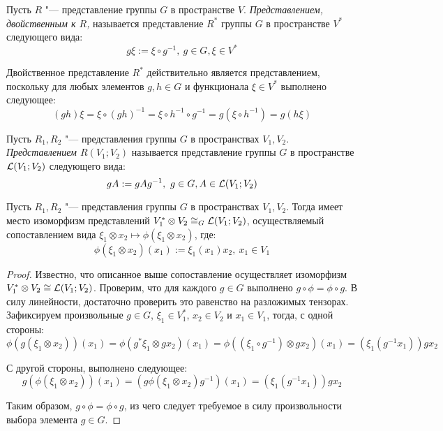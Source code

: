 \begin{definition}
	Пусть $R$ "--- представление группы $G$ в пространстве $V$. \textit{Представлением, двойственным к $R$,} называется представление $R^*$ группы $G$ в пространстве $V^*$ следующего вида:
	\[g\xi := \xi\circ g^{-1},~g \in G, \xi \in V^*\]
\end{definition}

\begin{note}
	Двойственное представление $R^*$ действительно является представлением, поскольку для любых элементов $g, h \in G$ и функционала $\xi \in V^*$ выполнено следующее:
	\[(gh)\xi = \xi \circ (gh)^{-1} = \xi \circ h^{-1} \circ g^{-1} = g(\xi \circ h^{-1})= g(h\xi)\]
\end{note}

\begin{definition}
	Пусть $R_1, R_2$ "--- представления группы $G$ в пространствах $V_1, V_2$. \textit{Представлением $R(V_1; V_2)$} называется представление группы $G$ в пространстве $\mathcal L(V_1; V_2)$ следующего вида:
	\[gA := gAg^{-1},~g \in G, A \in \mathcal L(V_1; V_2)\]
\end{definition}

\begin{proposition}
	Пусть $R_1, R_2$ "--- представления группы $G$ в пространствах $V_1, V_2$. Тогда имеет место изоморфизм представлений $V_1^* \otimes V_2 \cong_G \mathcal L(V_1; V_2)$, осуществляемый сопоставлением вида $\xi_1 \otimes x_2 \mapsto \phi(\xi_1 \otimes x_2)$, где:
	\[\phi(\xi_1 \otimes x_2)(x_1) := \xi_1(x_1)x_2,~x_1 \in V_1\]
\end{proposition}

\begin{proof}
	Известно, что описанное выше сопоставление осуществляет изоморфизм $V_1^* \otimes V_2 \cong \mathcal L(V_1; V_2)$. Проверим, что для каждого $g \in G$ выполнено $g \circ \phi = \phi \circ g$. В силу линейности, достаточно проверить это равенство на разложимых тензорах. Зафиксируем произвольные $g \in G$, $\xi_1 \in V_1^*$, $x_2 \in V_2$ и $x_1 \in V_1$, тогда, с одной стороны:
	\[\phi(g(\xi_1 \otimes x_2))(x_1) = \phi(g^*\xi_1 \otimes gx_2)(x_1) = \phi((\xi_1 \circ g^{-1}) \otimes gx_2)(x_1) = (\xi_1(g^{-1}x_1))gx_2\]
	
	С другой стороны, выполнено следующее:
	\[g(\phi(\xi_1 \otimes x_2))(x_1) = (g\phi(\xi_1 \otimes x_2)g^{-1})(x_1) = (\xi_1(g^{-1}x_1))gx_2\]
	
	Таким образом, $g \circ \phi = \phi \circ g$, из чего следует требуемое в силу произвольности выбора элемента $g \in G$.
\end{proof}

